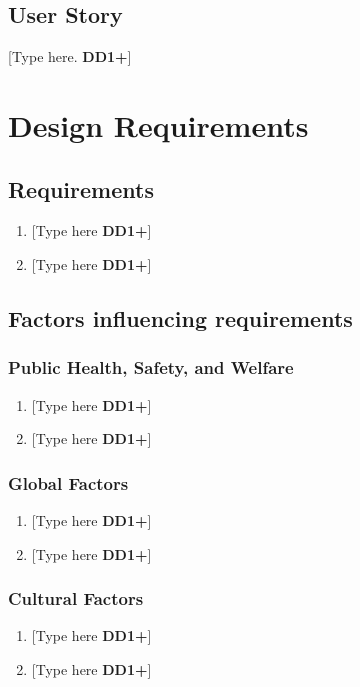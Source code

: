\documentclass[letterpaper, 11pt]{article}
\begin{document}
\subsection{User Story}
[Type here. \textbf{DD1+}]

\clearpage

\section{Design Requirements}
\subsection{Requirements}
\begin{enumerate}
    \item {[Type here \textbf{DD1+}]}
    \item {[Type here \textbf{DD1+}]}
\end{enumerate}

\clearpage

\subsection{Factors influencing requirements}
\subsubsection{Public Health, Safety, and Welfare}
\begin{enumerate}
    \item {[Type here \textbf{DD1+}]}
    \item {[Type here \textbf{DD1+}]}
\end{enumerate}

\subsubsection{Global Factors}
\begin{enumerate}
    \item {[Type here \textbf{DD1+}]}
    \item {[Type here \textbf{DD1+}]}
\end{enumerate}
    
\subsubsection{Cultural Factors}
\begin{enumerate}
    \item {[Type here \textbf{DD1+}]}
    \item {[Type here \textbf{DD1+}]}
\end{enumerate}
\end{document}
